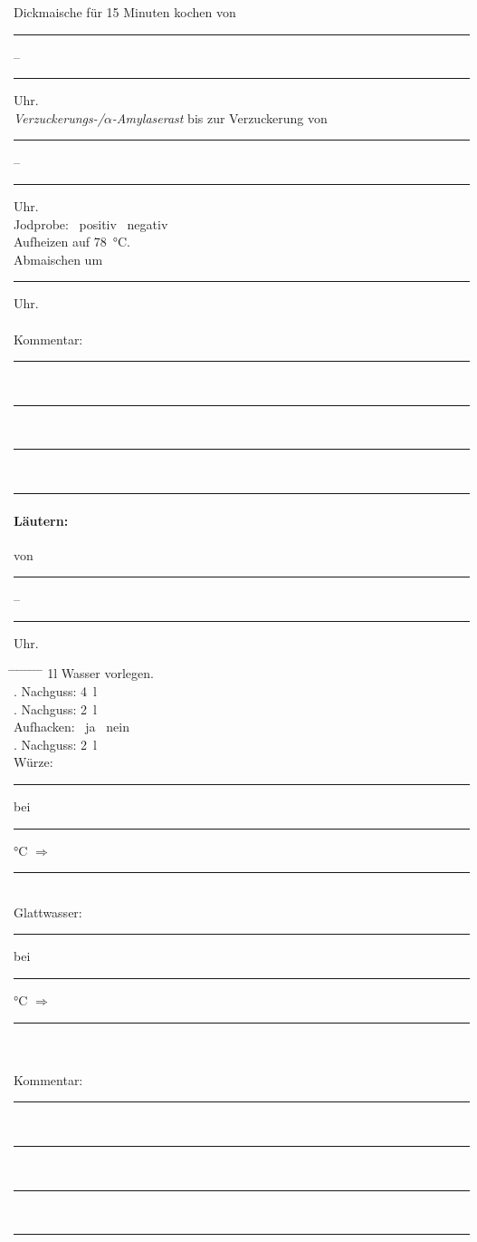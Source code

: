 \documentclass[12pt,oneside,a4paper]{scrartcl}
\newcommand{\Zeitluecke}{\rule[-0.1cm]{1.8cm}{0.5pt}}
\begin{document}
{\begin{tabbing}
		\> \> Dickmaische für 15 Minuten kochen von \Zeitluecke -- \Zeitluecke Uhr.\\
		\> \textit{Verzuckerungs-/$\alpha$-Amylaserast} bis zur Verzuckerung von \Zeitluecke -- \Zeitluecke Uhr.\\
		\> \> \> Jodprobe: \> \> \Square \ positiv \> \> \Square \ negativ\\
		\> \> Aufheizen auf \SI{78}{\degreeCelsius}.\\
		\> Abmaischen um \Zeitluecke Uhr.\\\\
		\> Kommentar: \>\>\> \rule[-0.1cm]{13cm}{0.5pt}\\
			\> \>  \rule[-0.1cm]{15.3cm}{0.5pt}\\
			\> \>  \rule[-0.1cm]{15.3cm}{0.5pt}\\
			\> \>  \rule[-0.1cm]{15.3cm}{0.5pt}	
	\end{tabbing}
%
\pagebreak
\paragraph{Läutern:} von \Zeitluecke -- \Zeitluecke Uhr.
	\begin{tabbing}
		\hspace{1cm} \= \hspace{1cm} \= \hspace{1cm} \= \hspace{1cm} \= \hspace{1cm} \=\hspace{1cm} \=\hspace{1cm} \=\hspace{1cm} \= \kill
		\> 1l Wasser vorlegen.\\
		\> . Nachguss: \> \> \> \SI{4}{\litre}\\
		\> . Nachguss: \> \> \> \SI{2}{\litre}\\
		\> \> \> Aufhacken: \> \> \Square \ ja \> \> \Square \ nein\\
		\> . Nachguss: \> \> \> \SI{2}{\litre}\\
		\> Würze: \> \> \> \rule[-0.1cm]{0.6cm}{0.5pt}\si{\plato} \> bei \> \rule[-0.1cm]{0.6cm}{0.5pt}\si{\degreeCelsius} \> $\Rightarrow$ \> \rule[-0.1cm]{0.6cm}{0.5pt}\si{\plato}\\
		\> Glattwasser: \> \> \> \rule[-0.1cm]{0.6cm}{0.5pt}\si{\plato} \> bei \> \rule[-0.1cm]{0.6cm}{0.5pt}\si{\degreeCelsius} \> $\Rightarrow$ \> \rule[-0.1cm]{0.6cm}{0.5pt}\si{\plato}\\\\
		\> Kommentar: \>\>\> \rule[-0.1cm]{13cm}{0.5pt}\\
			\> \>  \rule[-0.1cm]{15.3cm}{0.5pt}\\
			\> \>  \rule[-0.1cm]{15.3cm}{0.5pt}\\
			\> \>  \rule[-0.1cm]{15.3cm}{0.5pt}	
	\end{tabbing}
%
}
\end{document}
